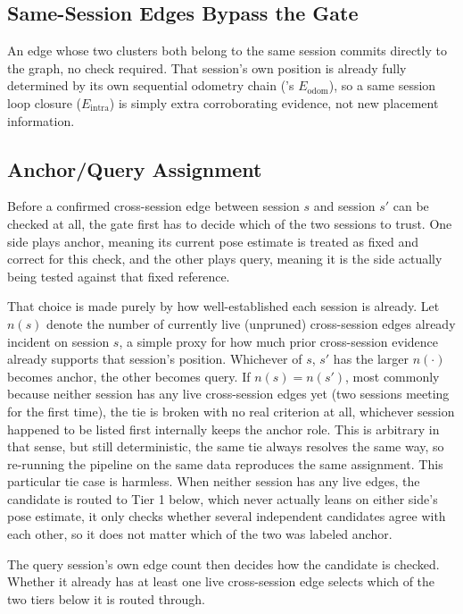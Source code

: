 \subsection{Same-Session Edges Bypass the Gate}

An edge whose two clusters both belong to the same session commits directly to the graph,
no check required. That session's own position is already fully determined by its own
sequential odometry chain ('s $E_{\mathrm{odom}}$), so a
same session loop closure ($E_{\mathrm{intra}}$) is simply extra corroborating evidence, not
new placement information.

\subsection{Anchor/Query Assignment}

Before a confirmed cross-session edge between session $s$ and session $s'$ can be checked at all, the gate first has to decide which of the two sessions to trust. One side plays anchor, meaning its current pose estimate is treated as fixed and correct for this check, and the other plays query, meaning it is the side actually being tested against that fixed reference.

That choice is made purely by how well-established each session is already. Let $n(s)$ denote the number of currently live (unpruned) cross-session edges already incident on session $s$, a simple proxy for how much prior cross-session evidence already supports that session's position. Whichever of $s$, $s'$ has the larger $n(\cdot)$ becomes anchor, the other becomes query. If $n(s) = n(s')$, most commonly because neither session has any live cross-session edges yet (two sessions meeting for the first time), the tie is broken with no real criterion at all, whichever session happened to be listed first internally keeps the anchor role. This is arbitrary in that sense, but still deterministic, the same tie always resolves the same way, so re-running the pipeline on the same data reproduces the same assignment. This particular tie case is harmless. When neither session has any live edges, the candidate is routed to Tier 1 below, which never actually leans on either side's pose estimate, it only checks whether several independent candidates agree with each other, so it does not matter which of the two was labeled anchor.

The query session's own edge count then decides how the candidate is checked. Whether it already has at least one live cross-session edge selects which of the two tiers below it is routed through.


